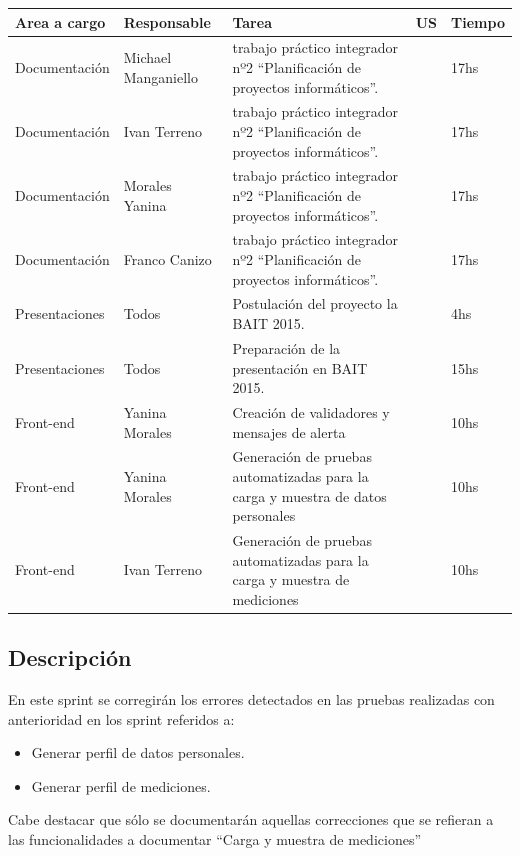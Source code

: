 \documentclass[a4paper,12pt]{article}
\begin{document}
	{\scriptsize
	\begin{center} %
	\centering
    \resizebox{\textwidth}{!}
    {
	\begin{tabular}{|l|l|p{5cm}|l|l|}
	    \hline
	        \textbf{Area a cargo} &
	        \textbf{Responsable} &        
	        \textbf{Tarea} &
	        \textbf{US} &
            \textbf{Tiempo}\\
   		\hline
       
	    Documentación& Michael Manganiello & trabajo práctico integrador nº2 ``Planificación de proyectos informáticos''. & & 17hs \\ \hline
        Documentación& Ivan Terreno & trabajo práctico integrador nº2 ``Planificación de proyectos informáticos''. & & 17hs \\ \hline
        Documentación& Morales Yanina & trabajo práctico integrador nº2 ``Planificación de proyectos informáticos''. & & 17hs \\ \hline
        Documentación& Franco Canizo & trabajo práctico integrador nº2 ``Planificación de proyectos informáticos''. & & 17hs \\ \hline
        Presentaciones& Todos & Postulación del proyecto la BAIT 2015. & & 4hs \\ \hline
        Presentaciones& Todos & Preparación de la presentación en BAIT 2015. & & 15hs \\ \hline        
	    Front-end& Yanina Morales & Creación de validadores y mensajes de alerta & & 10hs\\ \hline   
	    Front-end& Yanina Morales & Generación de pruebas automatizadas para la carga y muestra de datos personales& & 10hs\\ \hline  
	    Front-end& Ivan Terreno & Generación de pruebas automatizadas para la carga y muestra de mediciones & & 10hs\\ \hline  	              
	    \end{tabular}
        }
    	\end{center}
	}


\subsection{Descripción}
En este sprint se corregirán los errores detectados en las pruebas realizadas con anterioridad en los sprint referidos a:
    \begin{itemize}
    \item Generar perfil de datos personales.
    \item Generar  perfil de mediciones.
    \end{itemize}
Cabe destacar que sólo se documentarán aquellas correcciones que se refieran a las funcionalidades a documentar ``Carga y muestra de mediciones''
\end{document}

